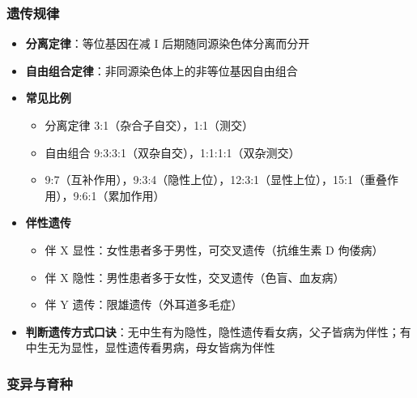 \subsubsection{遗传规律}

\begin{itemize}
  \item \textbf{分离定律}：等位基因在减 I 后期随同源染色体分离而分开
  \item \textbf{自由组合定律}：非同源染色体上的非等位基因自由组合
  \item \textbf{常见比例}
  \begin{itemize}
    \item 分离定律 3:1（杂合子自交），1:1（测交）
    \item 自由组合 9:3:3:1（双杂自交），1:1:1:1（双杂测交）
    \item 9:7（互补作用），9:3:4（隐性上位），12:3:1（显性上位），15:1（重叠作用），9:6:1（累加作用）
  \end{itemize}
  \item \textbf{伴性遗传}
  \begin{itemize}
    \item 伴 X 显性：女性患者多于男性，可交叉遗传（抗维生素 D 佝偻病）
    \item 伴 X 隐性：男性患者多于女性，交叉遗传（色盲、血友病）
    \item 伴 Y 遗传：限雄遗传（外耳道多毛症）
  \end{itemize}
  \item \textbf{判断遗传方式口诀}：无中生有为隐性，隐性遗传看女病，父子皆病为伴性；有中生无为显性，显性遗传看男病，母女皆病为伴性
\end{itemize}

\subsubsection{变异与育种}

